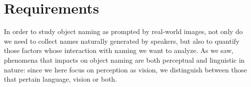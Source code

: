 

%

\section{Requirements}
In order to study object naming as prompted by real-world images, not only do we need to collect names naturally generated by speakers, but also to quantify those factors whose interaction with naming we want to analyze. As we saw, phenomena that impacts on object naming are both perceptual and linguistic in nature: since we here focus on perception as vision, we distinguish between those that pertain language, vision or both.

